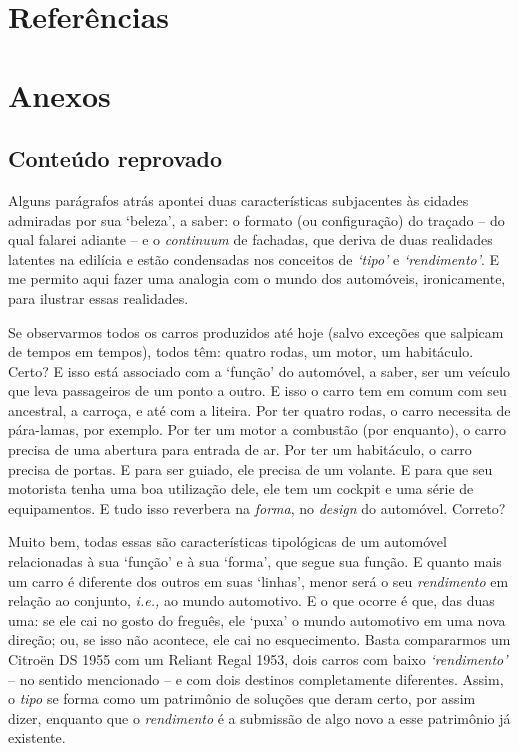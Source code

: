 \documentclass[12pt, a4paper]{book} %
\begin{document}
        \chapter*{Referências}


        \chapter*{Anexos}

        \section{Conteúdo reprovado}%
            Alguns parágrafos atrás apontei duas características subjacentes às cidades admiradas por sua `beleza', a saber: o formato (ou configuração) do traçado – do qual falarei adiante – e o \textit{continuum} de fachadas, que deriva de duas realidades latentes na edilícia e estão condensadas nos conceitos de \emph{`tipo'} e \emph{`rendimento'}. E me permito aqui fazer uma analogia com o mundo dos automóveis, ironicamente, para ilustrar essas realidades.

            Se observarmos todos os carros produzidos até hoje (salvo exceções que salpicam de tempos em tempos), todos têm: quatro rodas, um motor, um habitáculo. Certo? E isso está associado com a `função' do automóvel, a saber, ser um veículo que leva passageiros de um ponto a outro. E isso o carro tem em comum com seu ancestral, a carroça, e até com a liteira. Por ter quatro rodas, o carro necessita de pára-lamas, por exemplo. Por ter um motor a combustão (por enquanto), o carro precisa de uma abertura para entrada de ar. Por ter um habitáculo, o carro precisa de portas. E para ser guiado, ele precisa de um volante. E para que seu motorista tenha uma boa utilização dele, ele tem um cockpit e uma série de equipamentos. E tudo isso reverbera na \textit{forma}, no \textit{design} do automóvel. Correto? 

            Muito bem, todas essas são características tipológicas de um automóvel relacionadas à sua `função' e à sua `forma', que segue sua função. E quanto mais um carro é diferente dos outros em suas `linhas', menor será o seu \textit{rendimento} em relação ao conjunto, \textit{i.e.,} ao mundo automotivo. E o que ocorre é que, das duas uma: se ele cai no gosto do freguês, ele `puxa' o mundo automotivo em uma nova direção; ou, se isso não acontece, ele cai no esquecimento. Basta compararmos um Citroën DS 1955 com um Reliant Regal 1953, dois carros com baixo \textit{`rendimento'} – no sentido mencionado – e com dois destinos completamente diferentes. Assim, o \textit{tipo} se forma como um patrimônio de soluções que deram certo, por assim dizer, enquanto que o \textit{rendimento} é a submissão de algo novo a esse patrimônio já existente.
	
\end{document}
